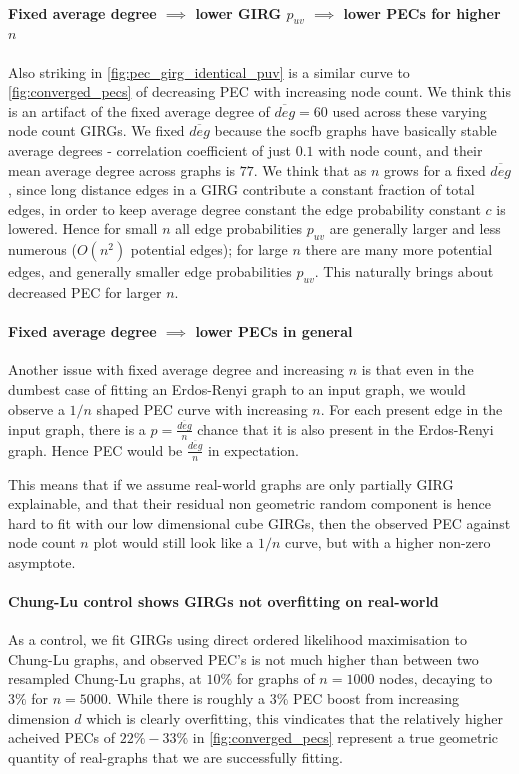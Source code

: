 \paragraph{Fixed average degree $\implies$ lower GIRG $p_{uv}$ $\implies$ lower PECs for higher $n$}
Also striking in \cref{fig:pec_girg_identical_puv} is a similar curve to \cref{fig:converged_pecs} of decreasing PEC with increasing node count. We think this is an artifact of the fixed average degree of $\overline{deg} = 60$ used across these varying node count GIRGs. We fixed $\overline{deg}$ because the socfb graphs have basically stable average degrees - correlation coefficient of just $0.1$ with node count, and their mean average degree across graphs is $77$. We think that as $n$ grows for a fixed $\overline{deg}$, since long distance edges in a GIRG contribute a constant fraction of total edges, in order to keep average degree constant the edge probability constant $c$ is lowered. Hence for  small $n$ all edge probabilities $p_{uv}$ are generally larger and less numerous ($O(n^2)$ potential edges); for large $n$ there are many more potential edges, and generally smaller edge probabilities $p_{uv}$. This naturally brings about decreased PEC for larger $n$.

\paragraph{Fixed average degree $\implies$ lower PECs in general}
Another issue with fixed average degree and increasing $n$ is that even in the dumbest case of fitting an Erdos-Renyi graph to an input graph, we would observe a $1/n$ shaped PEC curve with increasing $n$. For each present edge in the input graph, there is a $p = \frac{\overline{deg}}{n}$ chance that it is also present in the Erdos-Renyi graph. Hence PEC would be $\frac{\overline{deg}}{n}$ in expectation.

This means that if we assume real-world graphs are only partially GIRG explainable, and that their residual non geometric random component is hence hard to fit with our low dimensional cube GIRGs, then the observed PEC against node count $n$ plot would still look like a $1/n$ curve, but with a higher non-zero asymptote.

\paragraph{Chung-Lu control shows GIRGs not overfitting on real-world}
As a control, we fit GIRGs using direct ordered likelihood maximisation to Chung-Lu graphs, and observed PEC's is not much higher than between two resampled Chung-Lu graphs, at $10\%$ for graphs of $n=1000$ nodes, decaying to $3\%$ for $n=5000$. While there is roughly a $3\%$ PEC boost from increasing dimension $d$ which is clearly overfitting, this vindicates that the relatively higher acheived PECs of $22\% - 33\%$ in \cref{fig:converged_pecs} represent a true geometric quantity of real-graphs that we are successfully fitting.

